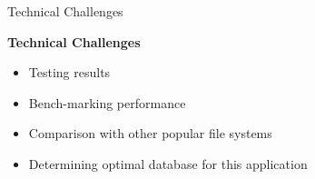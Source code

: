 \begin{frame}[t]{Technical Challenges}

  \hspace*{.6in}
  \begin{minipage}{3.5in}
  \begin{center}
	\vspace*{.3in}
	\textbf{Technical Challenges}\\
	\begin{itemize}
	\renewcommand{\labelitemi}{$\bullet$}
		\item Testing results
		\item Bench-marking performance
		\item Comparison with other popular file systems
		\item Determining optimal database for this application
	\end{itemize}
  
  \end{center}
  \end{minipage}

\end{frame}